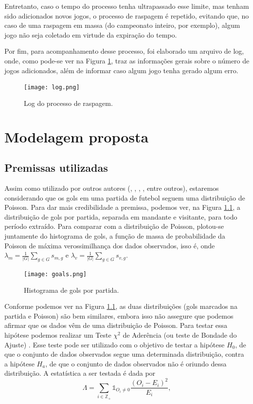 Entretanto, caso o tempo do processo tenha ultrapassado esse limite, mas tenham sido adicionados novos jogos, o processo de raspagem é repetido, evitando que, no caso de uma raspagem em massa (do campeonato inteiro, por exemplo), algum jogo não seja coletado em virtude da expiração do tempo.

Por fim, para acompanhamento desse processo, foi elaborado um arquivo de log, onde, como pode-se ver na Figura \ref{log}, traz as informações gerais sobre o número de jogos adicionados, além de informar caso algum jogo tenha gerado algum erro.
\begin{figure}
    \centering
    \texttt{[image: log.png]}
    \caption{Log do processo de raspagem.}
    \label{log}
\end{figure}

\chapter{Modelagem proposta}

\section{Premissas utilizadas}
\label{premissas}

Assim como utilizado por outros autores (\cite{beaudoin}, \cite{karlis2000}, \cite{karlis2003}, \cite{lee}, entre outros), estaremos considerando que os gols em uma partida de futebol seguem uma distribuição de Poisson. Para dar mais credibilidade a premissa, podemos ver, na Figura \ref{goals_graph}, a distribuição de gols por partida, separada em mandante e visitante, para todo período extraído. Para comparar com a distribuição de Poisson, plotou-se juntamente do histograma de gols, a função de massa de probabilidade da Poisson de máxima verossimilhança dos dados observados, isso é, onde $\lambda_m = \frac{1}{|G|}\sum_{g \in G} s_{m, g}$ e $\lambda_v = \frac{1}{|G|}\sum_{g \in G} s_{v, g}$.
\begin{figure}[h]
    \centering
    \texttt{[image: goals.png]}
    \caption{Histograma de gols por partida.}
    \label{goals_graph}
\end{figure}

Conforme podemos ver na Figura \ref{goals_graph}, as duas distribuições (gols marcados na partida e Poisson) são bem similares, embora isso não assegure que podemos afirmar que os dados vêm de uma distribuição de Poisson. Para testar essa hipótese podemos realizar um Teste $\chi^2$ de Aderência (ou teste de Bondade do Ajuste) \cite{gof}. Esse teste pode ser utilizado com o objetivo de testar a hipótese $H_0$, de que o conjunto de dados observados segue uma determinada distribuição, contra a hipótese $H_a$, de que o conjunto de dados observados não é oriundo dessa distribuição. A estatística a ser testada é dada por
\begin{equation}
    \Lambda = \sum_{i \in \mathbb{Z}_+} \mathbb{1}_{O_i \neq 0} \dfrac{\left(O_i - E_i\right)^2}{E_i},
    \label{lambda_teste}
\end{equation}


